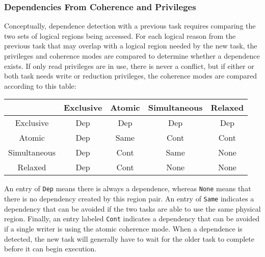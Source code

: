 \subsubsection{Dependencies From Coherence and Privileges}
\label{subsec:cohdep}
Conceptually, dependence detection with a previous task requires comparing the two sets of
logical regions being accessed.  For each logical reason from the previous task
that may overlap with a logical region needed by the new task, the privileges
and coherence modes are compared to determine whether a dependence exists.  If
only read privileges are in use, there is never a conflict, but if either or
both task needs write or reduction privileges, the coherence modes are compared
according to this table:

\vspace{2mm}
{\small
\begin{tabular}{c|cccc}
             & Exclusive & Atomic   & Simultaneous & Relaxed \\
\midrule
Exclusive    & Dep & Dep & Dep & Dep \\ 
Atomic       & Dep & Same & Cont & Cont \\
Simultaneous & Dep & Cont & Same & None \\
Relaxed      & Dep & Cont & None & None \\
\end{tabular}
}
\vspace{2mm}

An entry of {\tt Dep} means there is always a dependence, whereas {\tt None}
means that there is no dependency created by this region pair.  An entry of
{\tt Same} indicates a dependency that can be avoided if the two tasks are
able to use the same physical region.  Finally, an entry labeled {\tt Cont}
indicates a dependency that can be avoided if a single writer is using the
atomic coherence mode.  When a dependence is detected, the new task will
generally have to wait for the older task to complete before it can begin
execution.


